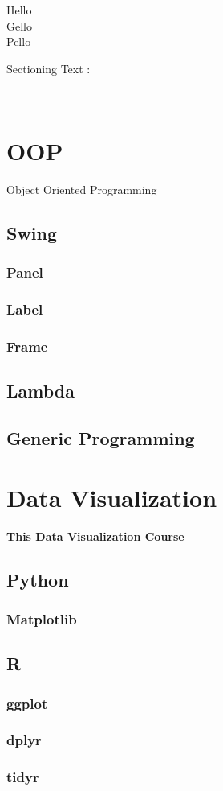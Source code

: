 \documentclass[11pt]{article}
\begin{document}
\centering
\tiny
Hello\\
Gello\\
Pello\\

\pagebreak
\flushleft
\begin{normalsize}Sectioning Text : \end{normalsize}\\[1cm]

\section{OOP}
\begin{Huge}
Object Oriented Programming
\end{Huge}
	\subsection{Swing}
		\subsubsection{Panel}
		\subsubsection{Label}
		\subsubsection{Frame}
	\subsection{Lambda}
	\subsection{Generic Programming}
\section{Data Visualization}
\begin{large}
\textbf{This Data Visualization Course}
\end{large}
	\subsection{Python}
		\subsubsection{Matplotlib}
	\subsection{R}
		\subsubsection{ggplot}
		\subsubsection{dplyr}
		\subsubsection{tidyr}
\end{document}

